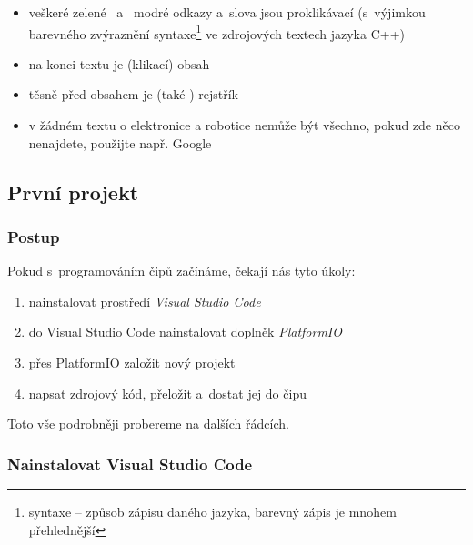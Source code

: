 \begin{itemize} 
\item veškeré \color{mygreen} zelené\color{black} \ a~\color{blue} modré \color{black} 
 \color{black} odkazy a~slova jsou proklikávací (s~výjimkou barevného zvýraznění 
syntaxe\footnote{syntaxe -- způsob zápisu daného jazyka, barevný zápis je mnohem přehlednější} ve zdrojových textech jazyka C++)
\item na konci textu je (klikací) obsah 
\item těsně před obsahem je (také ) rejstřík
\item v žádném textu o elektronice a robotice nemůže být všechno, pokud zde něco nenajdete, použijte např. Google
\end{itemize}


\subsection{První projekt}
 
\subsubsection*{Postup}

Pokud s~programováním čipů začínáme, čekají nás tyto úkoly:
\begin{enumerate}
\item  nainstalovat prostředí {\it Visual Studio Code}
\item  do Visual Studio Code nainstalovat doplněk {\it PlatformIO }
\item  přes PlatformIO založit nový projekt
\item  napsat zdrojový kód, přeložit a~dostat jej do čipu 
\end{enumerate}
Toto vše podrobněji probereme na dalších řádcích. 

\label{vsc} \subsubsection{Nainstalovat  Visual Studio Code} \label{vscode}

